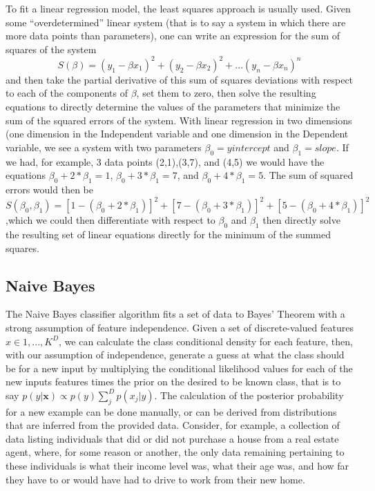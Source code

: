 To fit a linear regression model, the least squares approach is usually used.
Given some  ``overdetermined'' linear system (that is to say a system in which
there are more data points than parameters), one can write an expression for the
sum of squares of the system
$$S(\beta) = (y_1 - \beta x_1)^2 + (y_2 - \beta x_2)^2 + ... (y_n - \beta x_n)^n$$
and then take the partial derivative of this sum of squares deviations with respect
to each of the components of $\beta$, set them to zero, then solve the resulting
equations to directly determine the values of the parameters that
minimize the sum of the squared errors of the system. With linear regression in
two dimensions (one dimension in the Independent variable and one dimension in
the Dependent variable, we see a system with two parameters
$\beta_0 = y intercept$ and $\beta_1 = slope$. If we had, for example, 3 data
points (2,1),(3,7), and (4,5) we would have the equations
$\beta_0 + 2*\beta_1 = 1$, $\beta_0 + 3*\beta_1 = 7$, and
$\beta_0 + 4*\beta_1 = 5$. The sum of squared errors would then be
 $S(\beta_0,\beta_1)= [1 - (\beta_0 + 2*\beta_1)]^2 + [7 - (\beta_0 + 3*\beta_1)]^2 + [5 - (\beta_0 + 4*\beta_1)]^2$
,which we could then differentiate with respect to $\beta_0$ and $\beta_1$ then
directly solve the resulting set of linear equations directly for the minimum of
the summed squares.
\subsection{Naive Bayes}
The Naive Bayes classifier algorithm fits a set of data to Bayes' Theorem with a
strong assumption of feature independence. Given a set of discrete-valued
features $x \in {1,...,K}^D$, we can calculate the class conditional density for
each feature, then, with our assumption of independence, generate a guess
at what the class should be for a new input by multiplying the conditional
likelihood values for each of the new inputs features times the prior on the
desired to be known class, that is to say
$p(y|\textbf{x}) \propto p(y) \sum_{j}^{D}p(x_j|y)$.
The calculation of the posterior probability for a new example can be done
manually, or can be derived from distributions that are inferred from the
provided data. Consider, for example, a collection of data listing individuals
that did or did not purchase a house from a real estate agent, where, for some
reason or another, the only data remaining pertaining to these individuals is
what their income level was, what their age was, and how far they have to or
would have had to drive to work from their new home.

